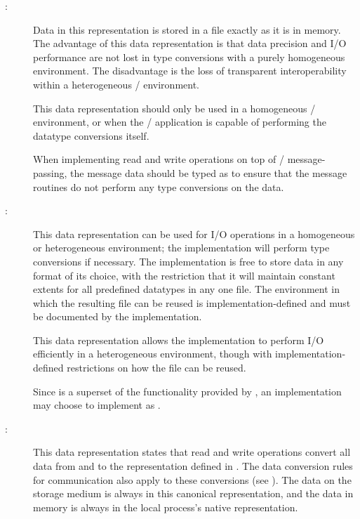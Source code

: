 \begin{description}
\item[:]
%
Data in this representation is stored in a file exactly
as it is in memory.
The advantage of this data representation is that
data precision and I/O performance are not lost in type conversions
with a purely homogeneous environment.
The disadvantage is the loss of transparent interoperability within a
heterogeneous \MPI/ environment.

\begin{users}
This data representation should only be used in a homogeneous
\MPI/ environment, or when the \MPI/ application is capable of performing
the datatype conversions itself.
\end{users}

\begin{implementors}
When implementing read and write operations
on top of \MPI/ message-passing, the message data should be typed as
 to ensure that the message routines do not perform any
type conversions on the data.
\end{implementors}

\item[:]
%
This data representation can be used for I/O operations in a homogeneous or
heterogeneous environment; the implementation will perform type
conversions if necessary. The implementation is free to store data in
any format of its choice,
with the restriction that it will maintain constant extents
for all predefined datatypes in any one file.
The environment in which the resulting file 
can be reused is implementation-defined
and must be documented by the implementation.

\begin{rationale}
This data representation allows the implementation
to perform I/O efficiently in a
heterogeneous environment, though with implementation-defined
restrictions on how the file can be reused.
\end{rationale}

\begin{implementors}
Since  is a superset of the
functionality provided by ,
an implementation may choose to implement 
as .
\end{implementors}

\item[:]
%
This data representation states that read and write operations
convert all data from
and to the 
representation defined in .
The data conversion rules for communication also apply to these
conversions (see ).
The data on the storage
medium is always in this canonical representation, and
the data in memory
is always in the local process's native representation.


\end{description}
